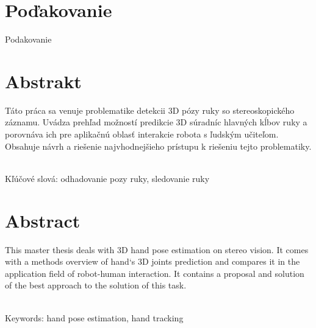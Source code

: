 \documentclass[12pt, a4paper, oneside]{book}
\begin{document}
\chapter*{Poďakovanie}\label{chap:thank_you}
Podakovanie
\vfill\eject 

\chapter*{Abstrakt}\label{chap:abstract_sk}
Táto práca sa venuje problematike detekcii 3D pózy ruky so stereoskopického záznamu. Uvádza prehľad možností predikcie 3D súradníc hlavných kĺbov ruky a porovnáva ich pre aplikačnú oblasť interakcie robota s ľudským učiteľom. Obsahuje návrh a riešenie najvhodnejšieho prístupu k riešeniu tejto problematiky.

~\\
Kľúčové slová: odhadovanie pozy ruky, sledovanie ruky
\vfill\eject 

\chapter*{Abstract}\label{chap:abstract_en}
This master thesis deals with 3D hand pose estimation on stereo vision. It comes with a methods overview of hand`s 3D joints prediction and compares it in the application field of robot-human interaction. It contains a proposal and solution of the best approach to the solution of this task.

~\\
Keywords: hand pose estimation, hand tracking
\vfill\eject 

\tableofcontents

\mainmatter









\backmatter

\nocite{*} %



\listoffigures
\end{document}
